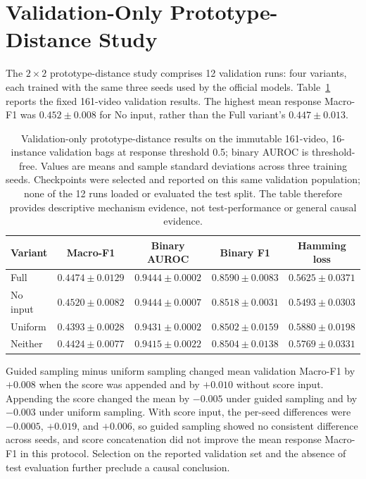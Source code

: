 \section{Validation-Only Prototype-Distance Study}
\label{sec:results-ablation}

The $2\times2$ prototype-distance study comprises 12 validation runs: four variants, each trained with the same three seeds used by the official models. Table~\ref{tab:results-ablation} reports the fixed 161-video validation results. The highest mean response Macro-F1 was $0.452 \pm 0.008$ for No input, rather than the Full variant's $0.447 \pm 0.013$.

\begin{table}[tbp]
    \centering
    \small
    \caption[Validation-only prototype-distance study.]{Validation-only prototype-distance results on the immutable 161-video, 16-instance validation bags at response threshold 0.5; binary AUROC is threshold-free. Values are means and sample standard deviations across three training seeds. Checkpoints were selected and reported on this same validation population; none of the 12 runs loaded or evaluated the test split. The table therefore provides descriptive mechanism evidence, not test-performance or general causal evidence.}
    \label{tab:results-ablation}
    \begin{tabularx}{\textwidth}{@{}Xcccc@{}}
        \toprule
        \textbf{Variant} & \textbf{Macro-F1} & \textbf{Binary AUROC} & \textbf{Binary F1} & \textbf{Hamming loss} \\
        \midrule
        Full & $0.4474 \pm 0.0129$ & $0.9444 \pm 0.0002$ & $0.8590 \pm 0.0083$ & $0.5625 \pm 0.0371$ \\
        No input & $0.4520 \pm 0.0082$ & $0.9444 \pm 0.0007$ & $0.8518 \pm 0.0031$ & $0.5493 \pm 0.0303$ \\
        Uniform & $0.4393 \pm 0.0028$ & $0.9431 \pm 0.0002$ & $0.8502 \pm 0.0159$ & $0.5880 \pm 0.0198$ \\
        Neither & $0.4424 \pm 0.0077$ & $0.9415 \pm 0.0022$ & $0.8504 \pm 0.0138$ & $0.5769 \pm 0.0331$ \\
        \bottomrule
    \end{tabularx}
\end{table}

Guided sampling minus uniform sampling changed mean validation Macro-F1 by $+0.008$ when the score was appended and by $+0.010$ without score input. Appending the score changed the mean by $-0.005$ under guided sampling and by $-0.003$ under uniform sampling. With score input, the per-seed differences were $-0.0005$, $+0.019$, and $+0.006$, so guided sampling showed no consistent difference across seeds, and score concatenation did not improve the mean response Macro-F1 in this protocol. Selection on the reported validation set and the absence of test evaluation further preclude a causal conclusion.

